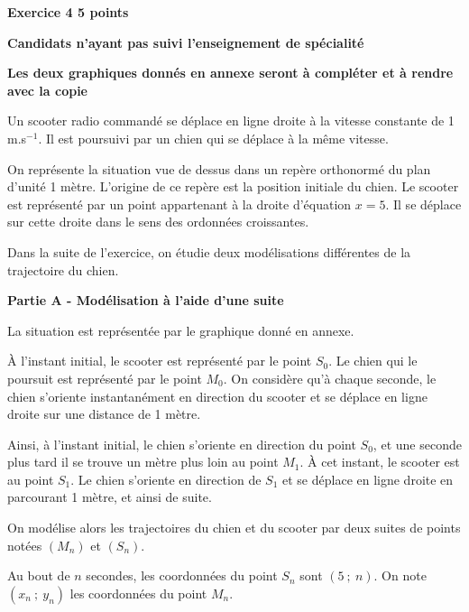 \documentclass[10pt]{article}
\begin{document}
\vspace{0,5cm}

\textbf{Exercice 4 \hfill  5 points}

\textbf{Candidats n'ayant pas suivi l'enseignement de spécialité}

\medskip

\textbf{Les deux graphiques donnés en annexe seront à compléter et à rendre avec la copie}

\medskip

Un scooter radio commandé se déplace en ligne droite à la vitesse constante de 1 m.s$^{-1}$. Il est poursuivi
par un chien qui se déplace à la même vitesse. 

On représente la situation vue de dessus dans un repère orthonormé du plan d'unité 1 mètre. L'origine de ce repère est la position initiale du chien. Le scooter est représenté par un point appartenant à la droite d'équation $x = 5$. Il se déplace sur cette droite dans le sens des ordonnées croissantes.

\smallskip

Dans la suite de l'exercice, on étudie deux modélisations différentes de la trajectoire du chien.

\bigskip

\textbf{Partie A - Modélisation à l'aide d'une suite}

\medskip

La situation est représentée par le graphique  donné en annexe.

À l'instant initial, le scooter est représenté par le point $S_0$. Le chien qui le poursuit est représenté
par le point $M_0$. On considère qu'à chaque seconde, le chien s'oriente instantanément en direction
du scooter et se déplace en ligne droite sur une distance de 1 mètre.

Ainsi, à l'instant initial, le chien s'oriente en direction du point $S_0$, et une seconde plus tard il se
trouve un mètre plus loin au point $M_1$. À cet instant, le scooter est au point $S_1$. Le chien s'oriente
en direction de $S_1$ et se déplace en ligne droite en parcourant 1 mètre, et ainsi de suite.

On modélise alors les trajectoires du chien et du scooter par deux suites de points notées $\left(M_n\right)$ et $\left(S_n\right)$.

Au bout de $n$ secondes, les coordonnées du point $S_n$ sont $(5~;~n)$. On note $\left(x_n~;~y_n\right)$ les coordonnées du point $M_n$.

\medskip
\end{document}
